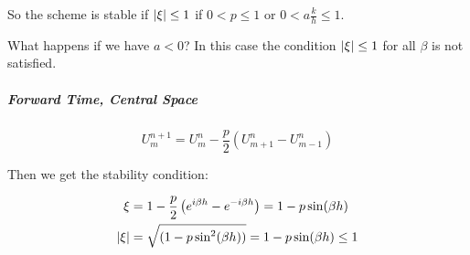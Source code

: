 So the scheme is stable if \(\lvert\xi\rvert \leq 1 \) if \(0 < p \leq 1\) or \(0 < a \frac{k}{h} \leq 1\).

What happens if we have \(a < 0\)? In this case the condition \(\lvert\xi\rvert \leq 1 \) for all \( \beta \) is not satisfied.

\subparagraph{Forward Time, Central Space}

\[
  U_m^{n+1} = U_m^n - \frac{p}{2}\left( U_{m+1}^n - U_{m-1}^n \right)
\]

Then we get the stability condition:

\begin{align*}
  \xi & = 1 - \frac{p}{2}\left( e^{i\beta h} - e^{-i\beta h} \right) = 1 - p\sin(\beta h) \\
  \lvert\xi\rvert & = \sqrt{(1 - p\sin^2(\beta h))} = 1 - p\sin(\beta h) \leq 1
\end{align*}



